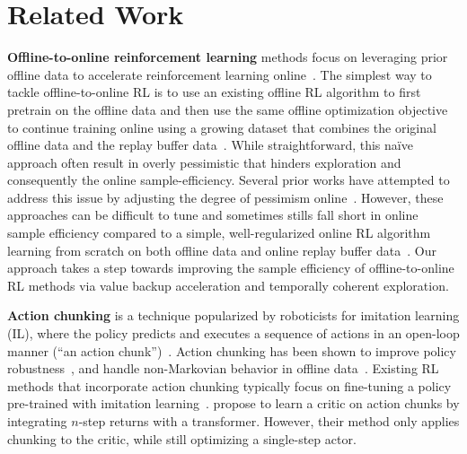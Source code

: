 \section{Related Work}
\label{sec:related}


\textbf{Offline-to-online reinforcement learning} methods focus on leveraging prior offline data to accelerate reinforcement learning online~\citep{xie2021policy, song2022hybrid, lee2022offline, NEURIPS2022_ba1c5356, zhang2023policy, zheng2023adaptive, ball2023efficient, nakamoto2024cal, zhou2024efficient, li2024accelerating}. The simplest way to tackle offline-to-online RL is to use an existing offline RL algorithm to first pretrain on the offline data and then use the same offline optimization objective to continue training online using a growing dataset that combines the original offline data and the replay buffer data~\citep{nair2020awac, kumar2020conservative, kostrikov2021offline, tarasov2024revisiting, park2025flow, agarwal2022reincarnating, luo2023finetuning, lee2022offline}. While straightforward, this na\"ive approach often result in overly pessimistic that hinders exploration and consequently the online sample-efficiency. Several prior works have attempted to address this issue by adjusting the degree of pessimism online~\citep{zhou2024efficient, nakamoto2024cal, luo2023finetuning, lee2022offline, wang2023train}.
However, these approaches can be difficult to tune and sometimes stills fall short in online sample efficiency compared to a simple, well-regularized online RL algorithm learning from scratch on both offline data and online replay buffer data~\citep{ball2023efficient}.
Our approach takes a step towards improving the sample efficiency of offline-to-online RL methods via value backup acceleration and temporally coherent exploration.

\textbf{Action chunking} is a technique popularized by roboticists for imitation learning (IL), where the policy predicts and executes a sequence of actions in an  open-loop manner (``an action chunk'')~\citep{zhao2023learning}. Action chunking has been shown to improve policy robustness~\citep{zhao2023learning, george2023one, bharadhwaj2024roboagent}, and handle non-Markovian behavior in offline data~\citep{zhao2023learning}.
Existing RL methods that incorporate action chunking typically focus on fine-tuning a policy pre-trained with imitation learning~\citep{ren2024diffusion, seo2024reinforcement}. \citet{tian2025chunking} propose to learn a critic on action chunks by integrating $n$-step returns with a transformer. However, their method only applies chunking to the critic, while still optimizing a single-step actor.

